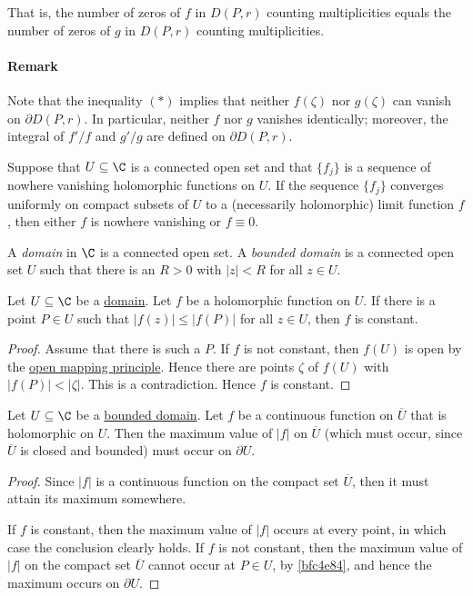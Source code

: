 That is, the number of zeros of $f$ in $D(P,r)$ counting multiplicities equals
the number of zeros of $g$ in $D(P,r)$ counting multiplicities.

\paragraph{Remark}

Note that the inequality $(*)$ implies that neither $f(\zeta)$ nor $g(\zeta)$
can vanish on $\partial D(P,r)$. In particular, neither $f$ nor $g$ vanishes
identically; moreover, the integral of $f'/f$ and $g'/g$ are defined on
$\partial D(P,r)$.

\label{a821cfc}

Suppose that $U\subseteq\C$ is a connected open set and that $\{f_j\}$ is a
sequence of nowhere vanishing holomorphic functions on $U$. If the sequence
$\{f_j\}$ converges uniformly on compact subsets of $U$ to a (necessarily
holomorphic) limit function $f$, then either $f$ is nowhere vanishing or
$f\equiv0$.

\label{f2be1bc}

A \textit{domain} in $\C$ is a connected open set. A \textit{bounded domain} is
a connected open set $U$ such that there is an $R>0$ with $|z|<R$ for all $z\in
U$.

\label{bfc4e84}

Let $U\subseteq\C$ be a \href{f2be1bc}{domain}. Let $f$ be a holomorphic
function on $U$. If there is a point $P\in U$ such that $|f(z)|\leq |f(P)|$ for
all $z\in U$, then $f$ is constant.

\begin{proof}
  Assume that there is such a $P$. If $f$ is not constant, then $f(U)$ is open
  by the \href{e5ecb18}{open mapping principle}. Hence there are points $\zeta$
  of $f(U)$ with $|f(P)|<|\zeta|$. This is a contradiction. Hence $f$ is
  constant.
\end{proof}

\label{befe6f9}

Let $U\subseteq\C$ be a \href{f2be1bc}{bounded domain}. Let $f$ be a continuous
function on $\overline U$ that is holomorphic on $U$. Then the maximum value of
$|f|$ on $\overline U$ (which must occur, since $\overline U$ is closed and
bounded) must occur on $\partial U$.

\begin{proof}
  Since $|f|$ is a continuous function on the compact set $\overline U$, then it
  must attain its maximum somewhere.

  If $f$ is constant, then the maximum value of $|f|$ occurs at every point, in
  which case the conclusion clearly holds. If $f$ is not constant, then the
  maximum value of $|f|$ on the compact set $\overline U$ cannot occur at $P\in
  U$, by \autoref{bfc4e84}, and hence the maximum occurs on $\partial U$.
\end{proof}

